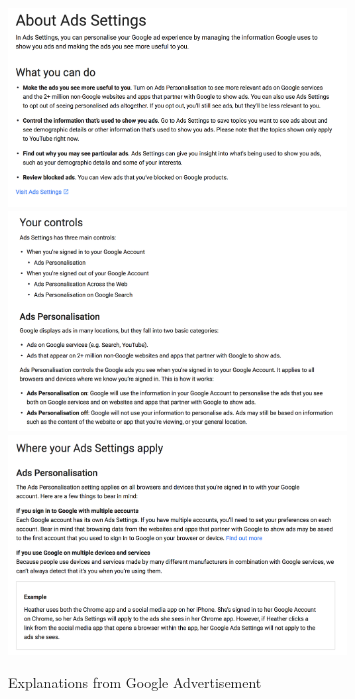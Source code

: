         \begin{figure}[H]
            \centering
            \captionsetup{justification=centering}
            \begin{mdframed}
                \includegraphics[width=0.8\textwidth]{img/googleAd4-1}
                \includegraphics[width=0.8\textwidth]{img/googleAd4-2}
                \includegraphics[width=0.8\textwidth]{img/googleAd4-3}
            \end{mdframed}
            \caption{Explanations from Google Advertisement\cite{googleAd4}}
            \label{img:googleAd4}
        \end{figure}
